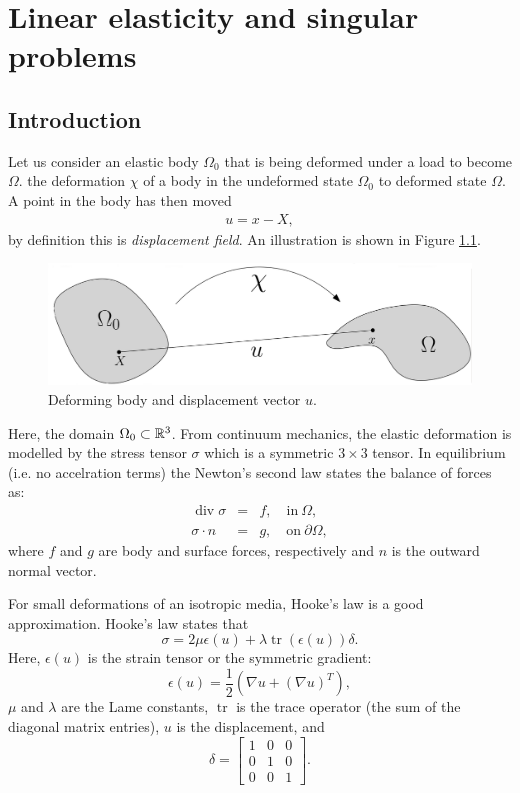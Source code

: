 \chapter{Linear elasticity and singular problems}
\label{chap-elasticity}

\section{Introduction} 

Let us consider an elastic body $\Omega_0$ that is being deformed under a load
to become $\Omega$.
the deformation $\chi$ of a body in the undeformed state $\Omega_0$ to deformed state $\Omega$. A point in the body has then moved
\begin{align}
u = x - X,
\end{align}
by definition this is \emph{displacement field}. An illustration is shown in Figure \ref{el:def}. 

\begin{figure}[h!]

\begin{center}
  \includegraphics[scale=0.25]{chapters/elasticity/displace.png}
  \end{center}
\caption{Deforming body and displacement vector $u$.}
\label{el:def}
\end{figure}

Here, the domain $\Omega_0 \subset \mathbb{R}^3$. From continuum mechanics, the elastic deformation is modelled by the stress tensor $\sigma$ which is a symmetric $3\times 3$ tensor. 
In equilibrium (i.e. no accelration terms) the Newton's second law states 
the balance of forces as: 
\begin{eqnarray*}  
\operatorname{div} \sigma &=& f, \quad\mbox{in}\ \Omega ,  \\ 
\sigma \cdot n &=& g, \quad\mbox{on}\ \partial \Omega,   
\end{eqnarray*}  
where $f$ and $g$ are body and surface forces,  respectively and $n$ is the outward normal vector.   

For small deformations of an isotropic media, Hooke's law is a good approximation. 
Hooke's law states that 
\[
\sigma = 2 \mu \epsilon(u) + \lambda \operatorname{tr}(\epsilon(u)) \delta.  
\]
Here, $\epsilon(u)$ is the strain tensor or the symmetric gradient: 
\[
\epsilon(u) = \frac{1}{2} (\nabla u + (\nabla u)^T),   
\]
$\mu$ and $\lambda$ are the Lame constants, $\operatorname{tr}$ is the trace operator (the sum of the diagonal matrix
entries), $u$ is the displacement, and  
\[
\delta = \left[ \begin{array}{ccc} 1 & 0 & 0 \\ 0 & 1 & 0 \\ 0 & 0 & 1 \end{array} \right].
\]

